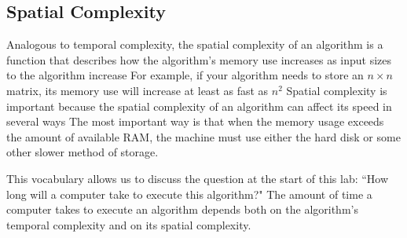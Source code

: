 \subsection*{Spatial Complexity} %

Analogous to temporal complexity, the spatial complexity of an algorithm is a function that describes how the algorithm's memory use increases as input sizes to the algorithm increase
For example, if your algorithm needs to store an $n \times n$ matrix, its memory use will increase at least as fast as $n^2$
Spatial complexity is important because  the spatial complexity of an algorithm can affect its speed in several ways
The most important way is that when the memory usage exceeds the amount of available RAM, the machine must use either the hard disk or some other slower method of storage.

This vocabulary allows us to discuss the question at the start of this lab: ``How long will a computer take to execute this algorithm?" The amount of time a computer takes to execute an algorithm depends both on the algorithm's temporal complexity and on its spatial complexity.

